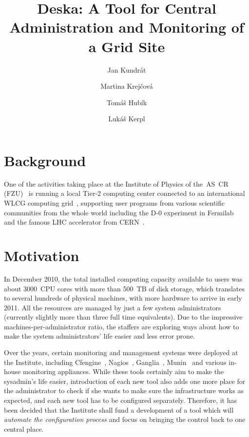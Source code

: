 \documentclass{article}
\begin{document}
\title{Deska: A Tool for Central Administration and Monitoring of a Grid Site}

\author{Jan Kundrát \and Martina Krejčová \and Tomáš Hubík \and Lukáš Kerpl}

\maketitle

\section{Background}

One of the activities taking place at the Institute of Physics of the~AS~CR (FZU)~\cite{fzu} is running a local Tier-2 computing
center connected to an international WLCG computing grid~\cite{wlcg}, supporting user programs from various scientific communities
from the whole world including the D-0 experiment in Fermilab~\cite{d0} and the famous LHC accelerator from CERN~\cite{lhc}.

\section{Motivation}

In December 2010, the total installed computing capacity available to users was about 3000~CPU cores with more than 500~TB of disk
storage, which translates to several hundreds of physical machines, with more hardware to arrive in early 2011.  All the resources
are managed by just a few system administrators (currently slightly more than three full time equivalents).  Due to the impressive
machines-per-administrator ratio, the staffers are exploring ways about how to make the system administrators' life easier and
less error prone.

Over the years, certain monitoring and management systems were deployed at the Institute, including Cfengine~\cite{cfengine},
Nagios~\cite{nagios}, Ganglia~\cite{ganglia}, Munin~\cite{munin} and various in-house monitoring appliances.  While these tools
certainly aim to make the sysadmin's life easier, introduction of each new tool also adds one more place for the administrator to
check if she wants to make sure the infrastructure works as expected, and each new tool has to be configured separately.
Therefore, it has been decided that the Institute shall fund a development of a tool which will {\em automate the configuration
process} and focus on bringing the control back to one central place.
\end{document}
